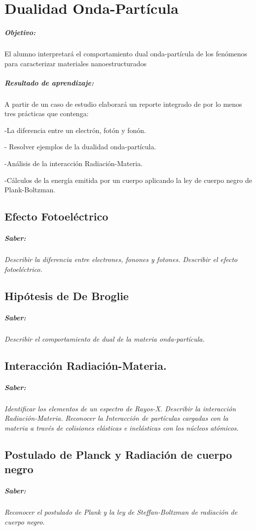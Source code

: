 \chapter{Dualidad Onda-Partícula}
\paragraph{Objetivo:}
El alumno interpretará el comportamiento dual onda-partícula de los fenómenos para caracterizar materiales nanoestructurados

\paragraph{Resultado de aprendizaje:}
A partir de un caso de estudio elaborará un reporte integrado de por lo menos tres prácticas que contenga:

-La diferencia entre un electrón, fotón y fonón.

- Resolver ejemplos de la dualidad onda-partícula.

-Análisis de la interacción Radiación-Materia.

-Cálculos de la energía emitida por un cuerpo aplicando la ley de cuerpo negro de Plank-Boltzman.

\section{Efecto Fotoeléctrico}

\paragraph{Saber: }
\textit{Describir la diferencia entre electrones, fonones y fotones. Describir el efecto	fotoeléctrico.}

\section{Hipótesis de De Broglie}

\paragraph{Saber: }
\textit{Describir el comportamiento de dual de la materia onda-partícula.}

\section{Interacción Radiación-Materia.}
\paragraph{Saber: }
\textit{Identificar los elementos de un espectro de Rayos-X. Describir la interacción Radiación-Materia. Reconocer la Interacción de partículas cargadas con la materia a través de colisiones elásticas e inelásticas con los núcleos atómicos. }

\section{Postulado de Planck y Radiación de
	cuerpo negro}
\paragraph{Saber: }
\textit{Reconocer el postulado de Plank y la ley de Steffan-Boltzman de radiación de cuerpo negro.}

